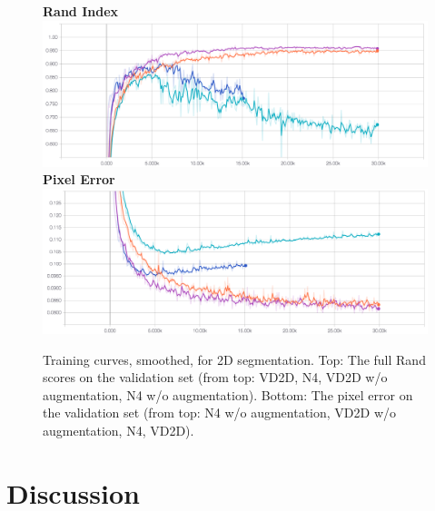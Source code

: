 \begin{figure}
\centering
\textbf{Rand Index}
\includegraphics[width=\textwidth]{img/2d_rand.png} \\
\textbf{Pixel Error}
\includegraphics[width=\textwidth]{img/2d_pixel.png}
\label{fig:training_curves}
\caption[Training curves for 2D segmentation]{Training curves, smoothed, for 2D segmentation. Top: The full Rand scores on the validation set (from top: VD2D, N4, VD2D w/o augmentation, N4 w/o augmentation). Bottom: The pixel error on the validation set (from top: N4 w/o augmentation, VD2D w/o augmentation, N4, VD2D).}

\end{figure}

\section{Discussion}